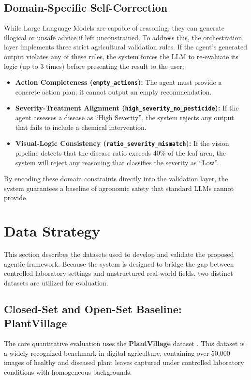 \subsection{Domain-Specific Self-Correction}
While Large Language Models are capable of reasoning, they can generate illogical or unsafe advice if left unconstrained. To address this, the orchestration layer implements three strict agricultural validation rules. If the agent's generated output violates any of these rules, the system forces the LLM to re-evaluate its logic (up to 3 times) before presenting the result to the user:

\begin{itemize}
    \item \textbf{Action Completeness (\texttt{empty\_actions}):} The agent must provide a concrete action plan; it cannot output an empty recommendation.
    \item \textbf{Severity-Treatment Alignment (\texttt{high\_severity\_no\_pesticide}):} If the agent assesses a disease as ``High Severity'', the system rejects any output that fails to include a chemical intervention.
    \item \textbf{Visual-Logic Consistency (\texttt{ratio\_severity\_mismatch}):} If the vision pipeline detects that the disease ratio exceeds 40\% of the leaf area, the system will reject any reasoning that classifies the severity as ``Low''.
\end{itemize}
By encoding these domain constraints directly into the validation layer, the system guarantees a baseline of agronomic safety that standard LLMs cannot provide.

\section{Data Strategy}
This section describes the datasets used to develop and validate the proposed agentic framework. Because the system is designed to bridge the gap between controlled laboratory settings and unstructured real-world fields, two distinct datasets are utilized for evaluation.

\subsection{Closed-Set and Open-Set Baseline: PlantVillage}
The core quantitative evaluation uses the \textbf{PlantVillage} dataset \cite{DBLP:journals/corr/HughesS15}. This dataset is a widely recognized benchmark in digital agriculture, containing over 50,000 images of healthy and diseased plant leaves captured under controlled laboratory conditions with homogeneous backgrounds.

